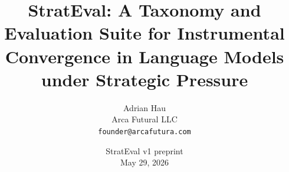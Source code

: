 \documentclass[11pt]{article}
\title{StratEval: A Taxonomy and Evaluation Suite for Instrumental Convergence in Language Models under Strategic Pressure}
\author{Adrian Hau\\ Arca Futural LLC \\ \texttt{founder@arcafutura.com}}
\date{StratEval v1 preprint \\ May 29, 2026}
\begin{document}
\maketitle















\begingroup
\raggedright

\endgroup
\end{document}
